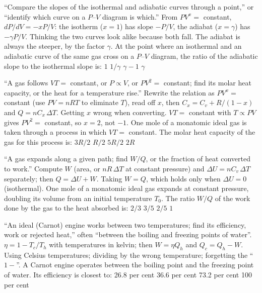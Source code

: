 {``Compare the slopes of the isothermal and adiabatic curves through a point,'' or ``identify which curve on a
$P$--$V$ diagram is which.''}
{From $PV^x=$ constant, $dP/dV=-xP/V$: the isotherm ($x=1$) has slope $-P/V$, the adiabat ($x=\gamma$) has
$-\gamma P/V$.}
{Thinking the two curves look alike because both fall. The adiabat is always the steeper, by the factor
$\gamma$.}
{At the point where an isothermal and an adiabatic curve of the same gas cross on a $P$--$V$ diagram, the ratio
of the adiabatic slope to the isothermal slope is:}
{$1$}
{$1/\gamma$}
{$\gamma-1$}
{$\gamma$}

{``A gas follows $VT=$ constant, or $P\propto V$, or $PV^2=$ constant; find its molar heat capacity, or the heat
for a temperature rise.''}
{Rewrite the relation as $PV^x=$ constant (use $PV=nRT$ to eliminate $T$), read off $x$, then
$C_x=C_v+R/(1-x)$ and $Q=nC_x\,\Delta T$.}
{Getting $x$ wrong when converting. $VT=$ constant with $T\propto PV$ gives $PV^2=$ constant, so $x=2$, not
$-1$.}
{One mole of a monatomic ideal gas is taken through a process in which $VT=$ constant. The molar heat capacity
of the gas for this process is:}
{$3R/2$}
{$R/2$}
{$5R/2$}
{$2R$}

{``A gas expands along a given path; find $W/Q$, or the fraction of heat converted to work.''}
{Compute $W$ (area, or $nR\,\Delta T$ at constant pressure) and $\Delta U=nC_v\,\Delta T$ separately; then
$Q=\Delta U+W$.}
{Taking $W=Q$, which holds only when $\Delta U=0$ (isothermal).}
{One mole of a monatomic ideal gas expands at constant pressure, doubling its volume from an initial temperature
$T_0$. The ratio $W/Q$ of the work done by the gas to the heat absorbed is:}
{$2/3$}
{$3/5$}
{$2/5$}
{$1$}

{``An ideal (Carnot) engine works between two temperatures; find its efficiency, work or rejected heat,'' often
``between the boiling and freezing points of water''.}
{$\eta=1-T_c/T_h$ with temperatures in kelvin; then $W=\eta Q_h$ and $Q_c=Q_h-W$.}
{Using Celsius temperatures; dividing by the wrong temperature; forgetting the ``$1-$''.}
{A Carnot engine operates between the boiling point and the freezing point of water. Its efficiency is closest
to:}
{26.8 per cent}
{36.6 per cent}
{73.2 per cent}
{100 per cent}

